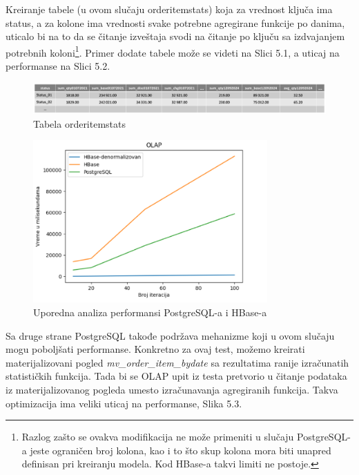 \documentclass[12pt,oneside]{memoir}
\begin{document}
Kreiranje tabele (u ovom slučaju orderitemstats) koja za vrednost ključa ima status, a za kolone ima vrednosti svake potrebne agregirane funkcije po danima, uticalo bi na to da se čitanje izveštaja svodi na čitanje po ključu sa izdvajanjem potrebnih koloni\footnote{ Razlog zašto se ovakva modifikacija ne može primeniti u slučaju PostgreSQL-a jeste ograničen broj kolona, kao i to što skup kolona mora biti unapred definisan pri kreiranju modela. Kod HBase-a takvi limiti ne postoje.}.
Primer dodate tabele može se videti na Slici 5.1, a uticaj na performanse na Slici 5.2.

\begin{figure}[!ht]
  \centering
  \includegraphics[width=1\textwidth]{denormalized-model.png}
  \caption{Tabela orderitemstats}
  \label{fig:grafikon}
\end{figure}

\begin{figure}[!ht]
  \centering
  \includegraphics[width=0.8\textwidth]{olap-vizualization.png}
  \caption{Uporedna analiza performansi PostgreSQL-a i HBase-a}
  \label{fig:grafikon}
\end{figure}

Sa druge strane PostgreSQL takođe podržava mehanizme koji u ovom slučaju mogu poboljšati performanse. Konkretno za ovaj test, možemo kreirati materijalizovani pogled \textit{mv\_order\_item\_bydate} sa rezultatima ranije izračunatih statističkih funkcija. Tada bi se OLAP upit iz testa pretvorio u čitanje podataka iz materijalizovanog pogleda umesto izračunavanja agregiranih funkcija. Takva optimizacija ima veliki uticaj na performanse, Slika 5.3.
\end{document}
